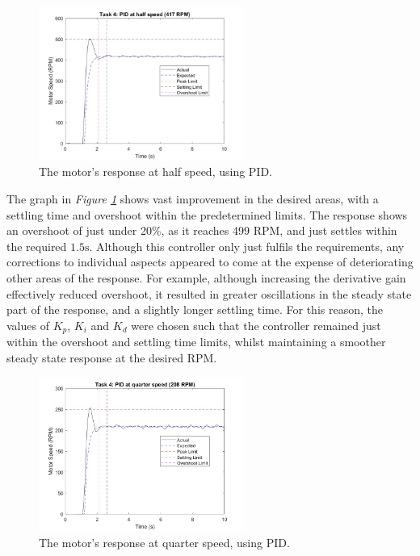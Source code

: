 \documentclass[11pt, onecolumn]{article}
\begin{document}
\begin{figure}[h!]
    \centering
    \includegraphics[width=0.6\textwidth]{q4-pid2.png}
    \caption{The motor's response at half speed, using PID.}
    \label{fig:q4-pid2}
\end{figure}
\par The graph in \textit{Figure \ref{fig:q4-pid2}} shows vast improvement in the desired areas, with a settling time and overshoot within the predetermined limits. The response shows an overshoot of just under 20\%, as it reaches 499 RPM, and just settles within the required $1.5 \text{s}$. Although this controller only just fulfils the requirements, any corrections to individual aspects appeared to come at the expense of deteriorating other areas of the response. For example, although increasing the derivative gain effectively reduced overshoot, it resulted in greater oscillations in the steady state part of the response, and a slightly longer settling time. For this reason, the values of $K_p$, $K_i$ and $K_d$ were chosen such that the controller remained just within the overshoot and settling time limits, whilst maintaining a smoother steady state response at the desired RPM.
\begin{figure}[h!]
    \centering
    \includegraphics[width=0.6\textwidth]{q4-pid3.png}
    \caption{The motor's response at quarter speed, using PID.}
    \label{fig:q4-pid3}
\end{figure}
\end{document}
